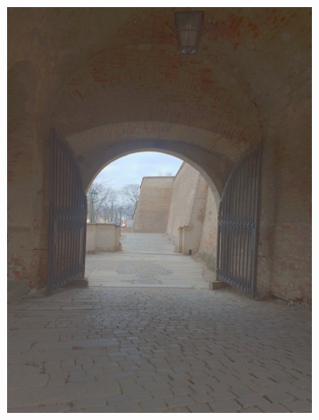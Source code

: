 \begin{figure}[h!]
  ~
  \begin{subfigure}{0.3\textwidth}
      \includegraphics[width=\textwidth]{figures/tests/tmo/rein2}
  \end{subfigure}
  ~
  \begin{subfigure}{0.3\textwidth}

\end{subfigure}
\end{figure}
